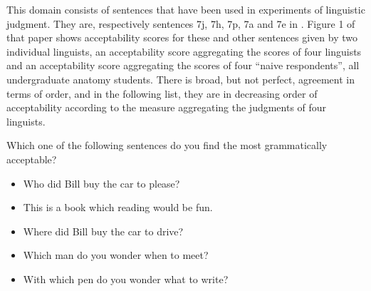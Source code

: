 This domain consists of sentences that have been used in experiments of linguistic judgment.
They are, respectively sentences 7j, 7h, 7p, 7a and 7e in \citet{BardRobeSora96}.
Figure 1 of that paper shows acceptability scores for these and other sentences given by two individual linguists, an acceptability score aggregating the scores of four linguists and an acceptability score aggregating the scores of four ``naive respondents'', all undergraduate anatomy students.
There is broad, but not perfect, agreement in terms of order, and in the following list, they are in decreasing order of acceptability according to the measure aggregating the judgments of four linguists.

\begin{tcolorbox}
Which one of the following sentences do you find the most grammatically acceptable?

\begin{itemize}
	\item Who did Bill buy the car to please?
	\item This is a book which reading would be fun.
	\item Where did Bill buy the car to drive?
	\item Which man do you wonder when to meet?
	\item With which pen do you wonder what to write?
\end{itemize}
\end{tcolorbox}
